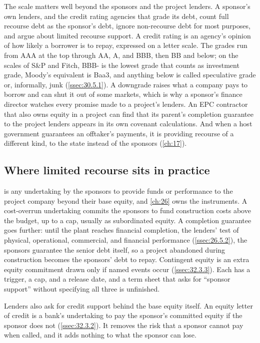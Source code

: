 The scale matters well beyond the sponsors and the project lenders. A sponsor's own lenders, and the credit rating agencies that grade its debt, count full recourse debt as the sponsor's debt, ignore non-recourse debt for most purposes, and argue about limited recourse support. A credit rating is an agency's opinion of how likely a borrower is to repay, expressed on a letter scale. The grades run from AAA at the top through AA, A, and BBB, then BB and below; on the scales of S\&P and Fitch, BBB- is the lowest grade that counts as investment grade, Moody's equivalent is Baa3, and anything below is called speculative grade or, informally, junk (\cref{ssec:30.5.1}). A downgrade raises what a company pays to borrow and can shut it out of some markets, which is why a sponsor's finance director watches every promise made to a project's lenders. An EPC contractor that also owns equity in a project can find that its parent's completion guarantee to the project lenders appears in its own covenant calculations. And when a host government guarantees an offtaker's payments, it is providing recourse of a different kind, to the state instead of the sponsors (\cref{ch:17}).

\subsection{Where limited recourse sits in practice}\label{ssec:2.2.2}

 is any undertaking by the sponsors to provide funds or performance to the project company beyond their base equity, and \cref{ch:26} owns the instruments. A cost-overrun undertaking commits the sponsors to fund construction costs above the budget, up to a cap, usually as subordinated equity. A completion guarantee goes further: until the plant reaches financial completion, the lenders' test of physical, operational, commercial, and financial performance (\cref{ssec:26.5.2}), the sponsors guarantee the senior debt itself, so a project abandoned during construction becomes the sponsors' debt to repay. Contingent equity is an extra equity commitment drawn only if named events occur (\cref{ssec:32.3.3}). Each has a trigger, a cap, and a release date, and a term sheet that asks for ``sponsor support'' without specifying all three is unfinished.

Lenders also ask for credit support behind the base equity itself. An equity letter of credit is a bank's undertaking to pay the sponsor's committed equity if the sponsor does not (\cref{ssec:32.3.2}). It removes the risk that a sponsor cannot pay when called, and it adds nothing to what the sponsor can lose.

